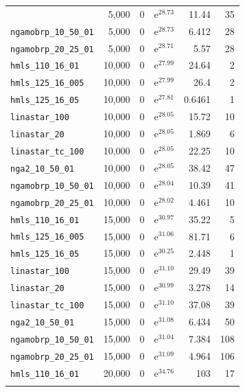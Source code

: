 \begin{longtable}{|l|r|r|r|r|r|}
{    \texttt{nga2\_10\_50\_01} & 5,000 & 0 & $\mathrm{e}^{28.73}$ & 11.44 & 35 \\
    \texttt{ngamobrp\_10\_50\_01} & 5,000 & 0 & $\mathrm{e}^{28.73}$ & 6.412 & 28 \\
    \texttt{ngamobrp\_20\_25\_01} & 5,000 & 0 & $\mathrm{e}^{28.71}$ & 5.57 & 28 \\
    \texttt{hmls\_110\_16\_01} & 10,000 & 0 & $\mathrm{e}^{27.99}$ & 24.64 & 2 \\
    \texttt{hmls\_125\_16\_005} & 10,000 & 0 & $\mathrm{e}^{27.99}$ & 26.4 & 2 \\
    \texttt{hmls\_125\_16\_05} & 10,000 & 0 & $\mathrm{e}^{27.81}$ & 0.6461 & 1 \\
    \texttt{linastar\_100} & 10,000 & 0 & $\mathrm{e}^{28.05}$ & 15.72 & 10 \\
    \texttt{linastar\_20} & 10,000 & 0 & $\mathrm{e}^{28.05}$ & 1.869 & 6 \\
    \texttt{linastar\_tc\_100} & 10,000 & 0 & $\mathrm{e}^{28.05}$ & 22.25 & 10 \\
    \texttt{nga2\_10\_50\_01} & 10,000 & 0 & $\mathrm{e}^{28.05}$ & 38.42 & 47 \\
    \texttt{ngamobrp\_10\_50\_01} & 10,000 & 0 & $\mathrm{e}^{28.04}$ & 10.39 & 41 \\
    \texttt{ngamobrp\_20\_25\_01} & 10,000 & 0 & $\mathrm{e}^{28.02}$ & 4.461 & 10 \\
    \texttt{hmls\_110\_16\_01} & 15,000 & 0 & $\mathrm{e}^{30.97}$ & 35.22 & 5 \\
    \texttt{hmls\_125\_16\_005} & 15,000 & 0 & $\mathrm{e}^{31.06}$ & 81.71 & 6 \\
    \texttt{hmls\_125\_16\_05} & 15,000 & 0 & $\mathrm{e}^{30.25}$ & 2.448 & 1 \\
    \texttt{linastar\_100} & 15,000 & 0 & $\mathrm{e}^{31.10}$ & 29.49 & 39 \\
    \texttt{linastar\_20} & 15,000 & 0 & $\mathrm{e}^{30.99}$ & 3.278 & 14 \\
    \texttt{linastar\_tc\_100} & 15,000 & 0 & $\mathrm{e}^{31.10}$ & 37.08 & 39 \\
    \texttt{nga2\_10\_50\_01} & 15,000 & 0 & $\mathrm{e}^{31.08}$ & 6.434 & 50 \\
    \texttt{ngamobrp\_10\_50\_01} & 15,000 & 0 & $\mathrm{e}^{31.04}$ & 7.384 & 108 \\
    \texttt{ngamobrp\_20\_25\_01} & 15,000 & 0 & $\mathrm{e}^{31.09}$ & 4.964 & 106 \\
    \texttt{hmls\_110\_16\_01} & 20,000 & 0 & $\mathrm{e}^{34.76}$ & 103 & 17 \\
}
\end{longtable}
